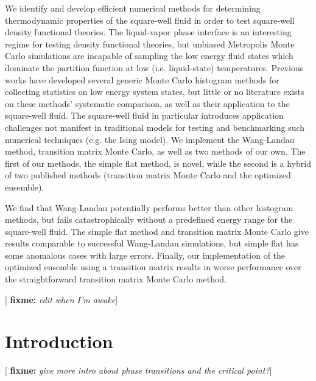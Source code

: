 \documentclass[11pt]{article}
\newcommand{\red}[1]{{\bf \color{red} #1}}
\newcommand{\fixme}[1]{[\red{fixme:} \emph{#1}]}
\begin{document}
\thispagestyle{abstract}

We identify and develop efficient numerical methods for determining
thermodynamic properties of the square-well fluid in order to test
square-well density functional theories. The liquid-vapor phase
interface is an interesting regime for testing density functional
theories, but unbiased Metropolis Monte Carlo simulations are
incapable of sampling the low energy fluid states which dominate the
partition function at low (i.e. liquid-state) temperatures. Previous
works have developed several generic Monte Carlo histogram methods for
collecting statistics on low energy system states, but little or no
literature exists on these methods' systematic comparison, as well as
their application to the square-well fluid. The square-well fluid in
particular introduces application challenges not manifest in
traditional models for testing and benchmarking such numerical
techniques (e.g. the Ising model). We implement the Wang-Landau
method, transition matrix Monte Carlo, as well as two methods of our
own. The first of our methods, the simple flat method, is novel, while
the second is a hybrid of two published methods (transition matrix
Monte Carlo and the optimized ensemble).

We find that Wang-Landau potentially performs better than other
histogram methods, but fails catastrophically without a predefined
energy range for the square-well fluid. The simple flat method and
transition matrix Monte Carlo give results comparable to successful
Wang-Landau simulations, but simple flat has some anomalous cases with
large errors. Finally, our implementation of the optimized ensemble
using a transition matrix results in worse performance over the
straightforward transition matrix Monte Carlo method.

\fixme{edit when I'm awake}


\newpage


\section{Introduction}
\label{sec:intro}

\fixme{give more intro about phase transitions and the critical
  point?}
\end{document}

